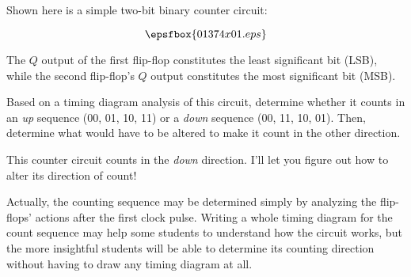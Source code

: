 

Shown here is a simple two-bit binary counter circuit:

$$\epsfbox{01374x01.eps}$$

The $Q$ output of the first flip-flop constitutes the least significant bit (LSB), while the second flip-flop's $Q$ output constitutes the most significant bit (MSB).

Based on a timing diagram analysis of this circuit, determine whether it counts in an {\it up} sequence (00, 01, 10, 11) or a {\it down} sequence (00, 11, 10, 01).  Then, determine what would have to be altered to make it count in the other direction.







This counter circuit counts in the {\it down} direction.  I'll let you figure out how to alter its direction of count!







Actually, the counting sequence may be determined simply by analyzing the flip-flops' actions after the first clock pulse.  Writing a whole timing diagram for the count sequence may help some students to understand how the circuit works, but the more insightful students will be able to determine its counting direction without having to draw any timing diagram at all.




